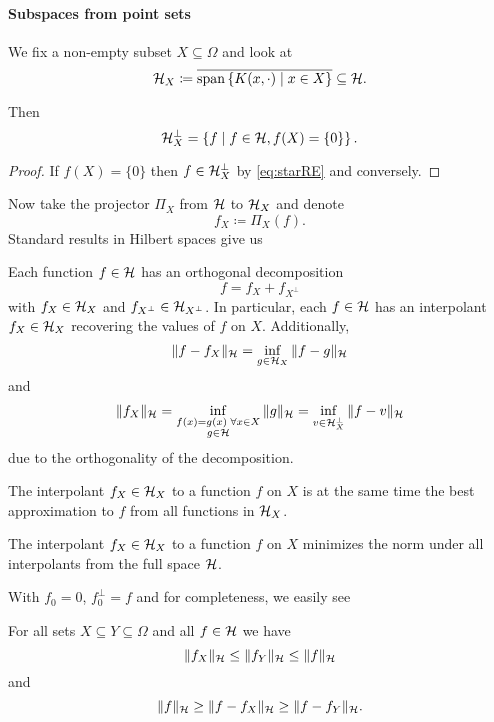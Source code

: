 \documentclass[../lecture-notes.tex]{subfiles}
\begin{document}
\paragraph*{Subspaces from point sets}
We fix a non-empty subset $X \subseteq \Omega$ and look at
\[
	\mathcal{H}_X \coloneqq \overline{\operatorname*{span} \left\{ K(x, \cdot) \mid x \in X \right\}} \subseteq \mathcal{H}.
\]
\begin{theorem} %
\label{thm:13}
Then
\[
	\mathcal{H}_X^\perp = \left\{ f \mid f \in \mathcal{H}, f(X) = \{ 0 \} \right\}.
\]
\end{theorem}
\begin{proof}
If $f(X) = \{ 0 \}$ then $f \in \mathcal{H}_X^\perp$ by \cref{eq:starRE} and conversely.
\end{proof}
Now take the projector $\Pi_X$ from $\mathcal{H}$ to $\mathcal{H}_X$ and denote
\[
	f_X \coloneqq \Pi_X(f).
\]
Standard results in Hilbert spaces give us
\begin{theorem} %
\label{thm:14}
Each function $f \in \mathcal{H}$ has an orthogonal decomposition
\[
	f = f_X + f_{X^\perp}
\]
with $f_X \in \mathcal{H}_X$ and $f_{X^\perp} \in \mathcal{H}_{X^\perp}$.
In particular, each $f \in \mathcal{H}$ has an interpolant $f_X \in \mathcal{H}_X$ recovering the values of $f$ on $X$.
Additionally,
\[
	\| f - f_X \|_{\mathcal{H}} = \inf_{g \in \mathcal{H}_X} \| f - g \|_{\mathcal{H}}
\]
and 
\[
	\| f_X \|_{\mathcal{H}} = \inf_{\substack{f(x) = g(x) \; \forall x \in X \\ g \in \mathcal{H}}} \| g \|_{\mathcal{H}} = \inf_{v \in \mathcal{H}_X^\perp} \| f - v \|_{\mathcal{H}}
\]
due to the orthogonality of the decomposition.
\end{theorem}
\begin{corollary} %
\label{thm:15}
The interpolant $f_X \in \mathcal{H}_X$ to a function $f$ on $X$ is at the same time the best approximation to $f$ from all functions in $\mathcal{H}_X$.
\end{corollary}
\begin{corollary} %
\label{thm:16}
The interpolant $f_X \in \mathcal{H}_X$ to a function $f$ on $X$ minimizes the norm under all interpolants from the full space $\mathcal{H}$.
\end{corollary}
With $f_0 = 0$, $f_0^\perp = f$ and 
for completeness, we easily see
\begin{corollary} %
\label{thm:17}
For all sets $X \subseteq Y \subseteq \Omega$ and all $f \in \mathcal{H}$ we have
\[
	\| f_X \|_{\mathcal{H}} \leq \| f_Y \|_{\mathcal{H}} \leq \| f \|_{\mathcal{H}}
\]
and
\[
	\| f \|_{\mathcal{H}} \geq \| f - f_X \|_{\mathcal{H}} \geq \| f - f_Y \|_{\mathcal{H}}.
\]
\end{corollary}
\end{document}
